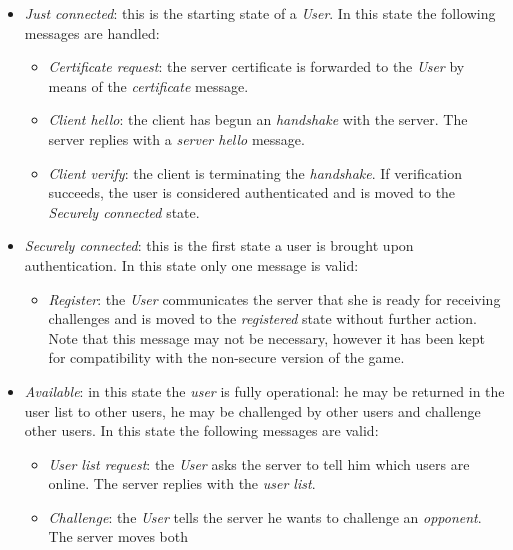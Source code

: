 \begin{itemize}
    \item \emph{Just connected}: this is the starting state of a \emph{User}.
        In this state the following messages are handled:
        \begin{itemize}
            \item \emph{Certificate request}: the server certificate is 
                forwarded to the \emph{User} by means of the \emph{certificate}
                message.
            \item \emph{Client hello}: the client has begun an \emph{handshake}
                with the server. The server replies with a \emph{server hello}
                message.
            \item \emph{Client verify}: the client is terminating the 
                \emph{handshake}. If verification succeeds, the user is 
                considered authenticated and is moved to the \emph{Securely 
                connected} state.
        \end{itemize}
    \item \emph{Securely connected}: this is the first state a user is brought 
        upon authentication. In this state only one message is valid:
        \begin{itemize}
            \item \emph{Register}: the \emph{User} communicates the server that
                she is ready for receiving challenges and is moved to the 
                \emph{registered} state without further action. Note that this
                message may not be necessary, however it has been kept for 
                compatibility with the non-secure version of the game.
        \end{itemize}
    \item \emph{Available}: in this state the \emph{user} is fully
        operational: he may be returned in the user list to other users, he may
        be challenged by other users and challenge other users. In this state 
        the following messages are valid:
        \begin{itemize}
            \item \emph{User list request}: the \emph{User} asks the server
                to tell him which users are online. The server replies with the 
                \emph{user list}.
            \item \emph{Challenge}: the \emph{User} tells the server he wants 
                to challenge an \emph{opponent}. The server moves both 

\end{itemize}
\end{itemize}
